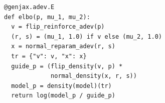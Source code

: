 \documentclass{article}
\begin{document}
\begin{verbatim}
@genjax.adev.E
def elbo(p, mu_1, mu_2):
  v = flip_reinforce_adev(p)
  (r, s) = (mu_1, 1.0) if v else (mu_2, 1.0)
  x = normal_reparam_adev(r, s)
  tr = {"v": v, "x": x}
  guide_p = (flip_density(v, p) *
             normal_density(x, r, s))
  model_p = density(model)(tr)
  return log(model_p / guide_p)
\end{verbatim}
\end{document}
